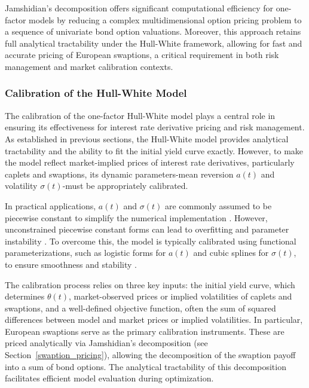 Jamshidian’s decomposition offers significant computational efficiency for one-factor models by reducing a complex multidimensional option pricing problem to a sequence of univariate bond option valuations. Moreover, this approach retains full analytical tractability under the Hull-White framework, allowing for fast and accurate pricing of European swaptions, a critical requirement in both risk management and market calibration contexts.

\subsubsection{Calibration of the Hull-White Model}
\label{calibration}
The calibration of the one-factor Hull-White model plays a central role in ensuring its effectiveness for interest rate derivative pricing and risk management. As established in previous sections, the Hull-White model provides analytical tractability and the ability to fit the initial yield curve exactly. However, to make the model reflect market-implied prices of interest rate derivatives, particularly caplets and swaptions, its dynamic parameters-mean reversion $a(t)$ and volatility $\sigma(t)$-must be appropriately calibrated.

In practical applications, $a(t)$ and $\sigma(t)$ are commonly assumed to be piecewise constant to simplify the numerical implementation \parencite[p.~7]{gurrieri2009calibration}. However, unconstrained piecewise constant forms can lead to overfitting and parameter instability \parencite[p.~2]{gurrieri2009calibration}. To overcome this, the model is typically calibrated using functional parameterizations, such as logistic forms for $a(t)$ and cubic splines for $\sigma(t)$, to ensure smoothness and stability \parencite[p.~8]{gurrieri2009calibration}.

The calibration process relies on three key inputs: the initial yield curve, which determines $\theta(t)$, market-observed prices or implied volatilities of caplets and swaptions, and a well-defined objective function, often the sum of squared differences between model and market prices or implied volatilities. In particular, European swaptions serve as the primary calibration instruments. These are priced analytically via Jamshidian’s decomposition (see Section~\ref{swaption_pricing}), allowing the decomposition of the swaption payoff into a sum of bond options. The analytical tractability of this decomposition facilitates efficient model evaluation during optimization.

